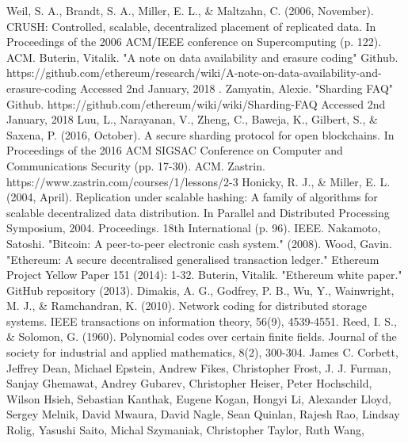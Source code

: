\documentclass[conference]{IEEEtran}
\begin{document}
\begin{thebibliography}{00}
     Weil, S. A., Brandt, S. A., Miller, E. L., \& Maltzahn, C.
        (2006, November). CRUSH: Controlled, scalable, decentralized placement
        of replicated data. In Proceedings of the 2006 ACM/IEEE conference on
        Supercomputing (p. 122). ACM.
     Buterin, Vitalik. "A note on data availability and erasure coding"
        Github. https://github.com/ethereum/research/wiki/A-note-on-data-availability-and-erasure-coding
        Accessed 2nd January, 2018 . 
     Zamyatin, Alexie. "Sharding FAQ" Github.
        https://github.com/ethereum/wiki/wiki/Sharding-FAQ
        Accessed 2nd January, 2018
     Luu, L., Narayanan, V., Zheng, C., Baweja, K., Gilbert, S., \&
        Saxena, P. (2016, October). A secure sharding protocol for open
        blockchains. In Proceedings of the 2016 ACM SIGSAC Conference on
        Computer and Communications Security (pp. 17-30). ACM.
     Zastrin. https://www.zastrin.com/courses/1/lessons/2-3
     Honicky, R. J., \& Miller, E. L. (2004, April). Replication
        under scalable hashing: A family of algorithms for scalable
        decentralized data distribution. In Parallel and Distributed Processing
        Symposium, 2004. Proceedings. 18th International (p. 96). IEEE.
     Nakamoto, Satoshi. "Bitcoin: A peer-to-peer electronic cash
        system." (2008).
     Wood, Gavin. "Ethereum: A secure decentralised generalised
        transaction ledger." Ethereum Project Yellow Paper 151 (2014): 1-32.
     Buterin, Vitalik. "Ethereum white paper." GitHub repository
        (2013).
     Dimakis, A. G., Godfrey, P. B., Wu, Y., Wainwright, M. J., &
        Ramchandran, K. (2010). Network coding for distributed storage systems.
        IEEE transactions on information theory, 56(9), 4539-4551.
     Reed, I. S., \& Solomon, G. (1960). Polynomial codes over
        certain finite fields. Journal of the society for industrial and applied
        mathematics, 8(2), 300-304.
     James C. Corbett, Jeffrey Dean, Michael Epstein, Andrew
        Fikes, Christopher Frost, J. J. Furman, Sanjay Ghemawat,
        Andrey Gubarev, Christopher Heiser, Peter Hochschild, Wilson Hsieh,
        Sebastian Kanthak, Eugene Kogan, Hongyi Li, Alexander Lloyd, Sergey
        Melnik, David Mwaura, David Nagle, Sean Quinlan, Rajesh Rao, Lindsay
        Rolig, Yasushi Saito, Michal Szymaniak, Christopher Taylor, Ruth Wang,

\end{thebibliography}
\end{document}

